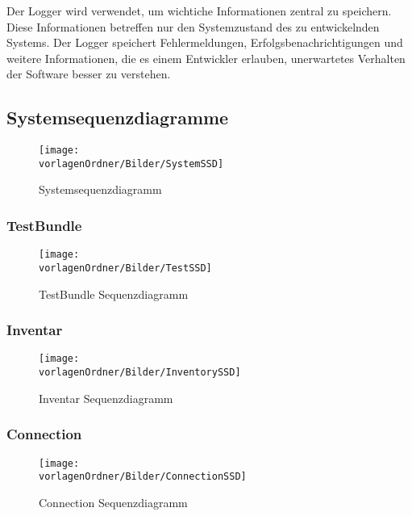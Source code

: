 \documentclass[]{subfiles}
\begin{document}
	Der Logger wird verwendet, um wichtiche Informationen zentral zu speichern. 
	Diese Informationen betreffen nur den Systemzustand des zu entwickelnden Systems.
	Der Logger speichert Fehlermeldungen, Erfolgsbenachrichtigungen und weitere Informationen, die es einem Entwickler erlauben, unerwartetes Verhalten der Software besser zu verstehen.

\begin{landscape}
	\subsection{Systemsequenzdiagramme}
	\begin{figure}[h!]
		\texttt{[image: \\vorlagenOrdner/Bilder/SystemSSD]}
		\caption{Systemsequenzdiagramm}
	\end{figure}
		\newpage
\end{landscape}
	
	\subsubsection{TestBundle}
	\begin{figure}[h!]
		\texttt{[image: \\vorlagenOrdner/Bilder/TestSSD]}
		\caption{TestBundle Sequenzdiagramm}
	\end{figure}

	\newpage
	
	\subsubsection{Inventar}
	\begin{figure}[h!]
		\texttt{[image: \\vorlagenOrdner/Bilder/InventorySSD]}
		\caption{Inventar Sequenzdiagramm}
	\end{figure}

	\newpage

	\subsubsection{Connection}
	\begin{figure}[h!]
		\texttt{[image: \\vorlagenOrdner/Bilder/ConnectionSSD]}
		\caption{Connection Sequenzdiagramm}		
	\end{figure}
		
\end{document}
